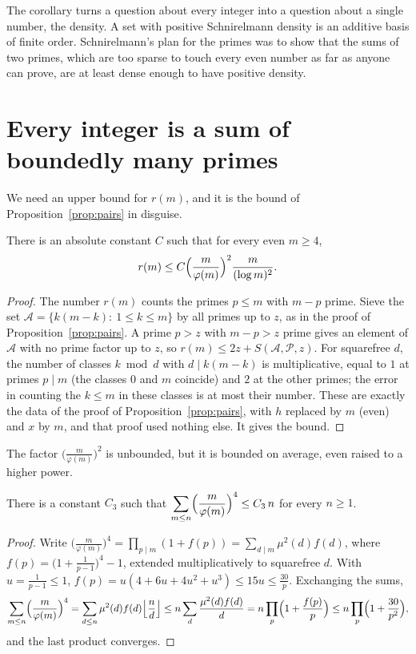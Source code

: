 The corollary turns a question about every integer into a question about a single number, the density. A set with positive Schnirelmann density is
an additive basis of finite order. Schnirelmann's plan for the primes was to show that the sums of two primes, which are too sparse to touch every
even number as far as anyone can prove, are at least dense enough to have positive density.

\section{Every integer is a sum of boundedly many primes}

We need an upper bound for $r(m)$, and it is the bound of Proposition~\ref{prop:pairs} in disguise.

\begin{proposition}\label{prop:goldbachsieve}
There is an absolute constant $C$ such that for every even $m\ge4$,
\[
r(m)\le C\Bigl(\frac m{\varphi(m)}\Bigr)^2\frac m{(\log m)^2}.
\]
\end{proposition}
\begin{proof}
The number $r(m)$ counts the primes $p\le m$ with $m-p$ prime. Sieve the set $\mathcal A=\{k(m-k):\ 1\le k\le m\}$ by all primes up to $z$, as in the
proof of Proposition~\ref{prop:pairs}. A prime $p>z$ with $m-p>z$ prime gives an element of $\mathcal A$ with no prime factor up to $z$, so
$r(m)\le2z+S(\mathcal A,\mathcal P,z)$. For squarefree $d$, the number of classes $k\bmod d$ with $d\mid k(m-k)$ is multiplicative, equal to $1$ at
primes $p\mid m$ (the classes $0$ and $m$ coincide) and $2$ at the other primes; the error in counting the $k\le m$ in these classes is at most their
number. These are exactly the data of the proof of Proposition~\ref{prop:pairs}, with $h$ replaced by $m$ (even) and $x$ by $m$, and that proof used
nothing else. It gives the bound.
\end{proof}

The factor $\bigl(\frac m{\varphi(m)}\bigr)^2$ is unbounded, but it is bounded on average, even raised to a higher power.

\begin{lemma}\label{lem:phifour}
There is a constant $C_3$ such that $\displaystyle\sum_{m\le n}\Bigl(\frac m{\varphi(m)}\Bigr)^4\le C_3\,n$ for every $n\ge1$.
\end{lemma}
\begin{proof}
Write $\bigl(\frac m{\varphi(m)}\bigr)^4=\prod_{p\mid m}(1+f(p))=\sum_{d\mid m}\mu^2(d)f(d)$, where $f(p)=\bigl(1+\frac1{p-1}\bigr)^4-1$, extended
multiplicatively to squarefree $d$. With $u=\frac1{p-1}\le1$, $f(p)=u(4+6u+4u^2+u^3)\le15u\le\frac{30}p$. Exchanging the sums,
\[
\sum_{m\le n}\Bigl(\frac m{\varphi(m)}\Bigr)^4=\sum_{d\le n}\mu^2(d)f(d)\Bigl\lfloor\frac nd\Bigr\rfloor\le n\sum_d\frac{\mu^2(d)f(d)}d=n\prod_p\Bigl(1+\frac{f(p)}p\Bigr)\le n\prod_p\Bigl(1+\frac{30}{p^2}\Bigr),
\]
and the last product converges.
\end{proof}

